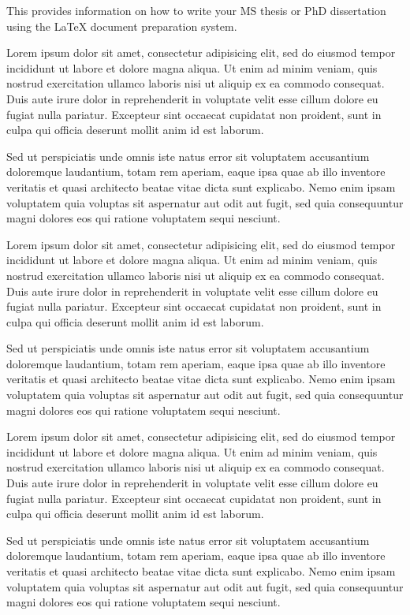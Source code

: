 %

This provides information on how to write your MS thesis or PhD dissertation 
using the \LaTeX{} document preparation system.

Lorem ipsum dolor sit amet, consectetur adipisicing elit, sed do eiusmod 
tempor incididunt ut labore et dolore magna aliqua. Ut enim ad minim veniam, 
quis nostrud exercitation ullamco laboris nisi ut aliquip ex ea commodo 
consequat. Duis aute irure dolor in reprehenderit in voluptate velit esse 
cillum dolore eu fugiat nulla pariatur. Excepteur sint occaecat cupidatat 
non proident, sunt in culpa qui officia deserunt mollit anim id est laborum.

Sed ut perspiciatis unde omnis iste natus error sit voluptatem accusantium 
doloremque laudantium, totam rem aperiam, eaque ipsa quae ab illo inventore 
veritatis et quasi architecto beatae vitae dicta sunt explicabo. Nemo enim 
ipsam voluptatem quia voluptas sit aspernatur aut odit aut fugit, sed quia 
consequuntur magni dolores eos qui ratione voluptatem sequi nesciunt.

Lorem ipsum dolor sit amet, consectetur adipisicing elit, sed do eiusmod 
tempor incididunt ut labore et dolore magna aliqua. Ut enim ad minim veniam, 
quis nostrud exercitation ullamco laboris nisi ut aliquip ex ea commodo 
consequat. Duis aute irure dolor in reprehenderit in voluptate velit esse 
cillum dolore eu fugiat nulla pariatur. Excepteur sint occaecat cupidatat 
non proident, sunt in culpa qui officia deserunt mollit anim id est laborum.

Sed ut perspiciatis unde omnis iste natus error sit voluptatem accusantium 
doloremque laudantium, totam rem aperiam, eaque ipsa quae ab illo inventore 
veritatis et quasi architecto beatae vitae dicta sunt explicabo. Nemo enim 
ipsam voluptatem quia voluptas sit aspernatur aut odit aut fugit, sed quia 
consequuntur magni dolores eos qui ratione voluptatem sequi nesciunt.

Lorem ipsum dolor sit amet, consectetur adipisicing elit, sed do eiusmod 
tempor incididunt ut labore et dolore magna aliqua. Ut enim ad minim veniam, 
quis nostrud exercitation ullamco laboris nisi ut aliquip ex ea commodo 
consequat. Duis aute irure dolor in reprehenderit in voluptate velit esse 
cillum dolore eu fugiat nulla pariatur. Excepteur sint occaecat cupidatat 
non proident, sunt in culpa qui officia deserunt mollit anim id est laborum.

Sed ut perspiciatis unde omnis iste natus error sit voluptatem accusantium 
doloremque laudantium, totam rem aperiam, eaque ipsa quae ab illo inventore 
veritatis et quasi architecto beatae vitae dicta sunt explicabo. Nemo enim 
ipsam voluptatem quia voluptas sit aspernatur aut odit aut fugit, sed quia 
consequuntur magni dolores eos qui ratione voluptatem sequi nesciunt.
